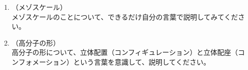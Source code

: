 \documentclass[a4paper,11pt]{jlreq}
\begin{document}
	\begin{enumerate}
		\item
		（メゾスケール）\\
		メゾスケールのことについて、できるだけ自分の言葉で説明してみてください。
		\item
		（高分子の形）\\
		高分子の形について、立体配置（コンフィギュレーション）と立体配座（コンフォメーション）という言葉を意識して、説明してください。

	\end{enumerate}
\end{document}

